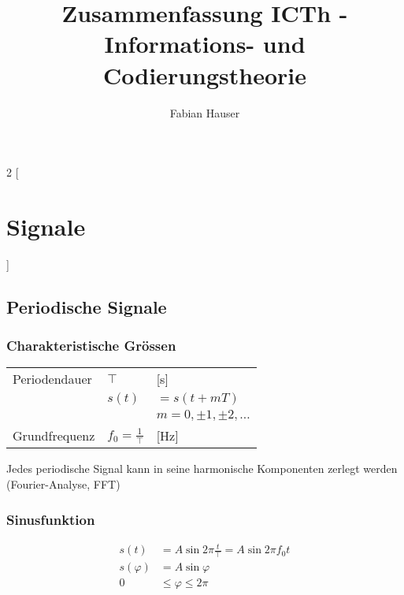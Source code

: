 

\title{Zusammenfassung ICTh - Informations- und Codierungstheorie}
\author{Fabian Hauser}
 

\maketitle
\begin{multicols}{2}
[
\section{Signale}
]

\subsection{Periodische Signale}

\subsubsection{Charakteristische Grössen}
\begin{tabular}{l l l}
	Periodendauer & $\top$ & [s] \\
	 & $s(t)$ & $=s(t+mT)$ \\
	 & & $m=0,\pm 1,\pm 2,\dots$ \\
	 Grundfrequenz & $f_0=\frac{1}{\top}$ & [Hz] \\
\end{tabular}

Jedes periodische Signal kann in seine harmonische Komponenten zerlegt werden (Fourier-Analyse, FFT)

\subsubsection{Sinusfunktion}
	\begin{align*}
	s(t) &= A \sin{ 2 \pi \frac{t}{\top}} = A \sin{2 \pi f_0 t} \\
	s(\varphi) &= A \sin{\varphi} \\
	0&\leq \varphi \le 2 \pi
	\end{align*}
	
	\noindent{}



\end{multicols}

